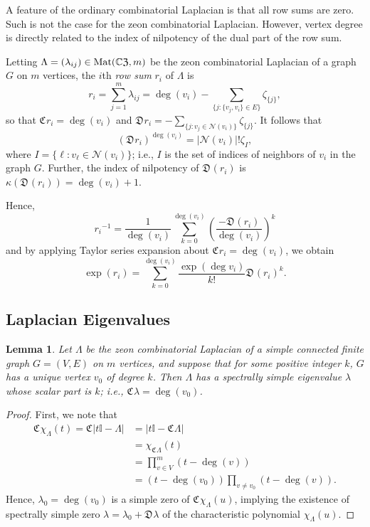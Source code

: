 \documentclass{article}
\newtheorem{lemma}[theorem]{Lemma}
\theoremstyle{definition}
\newcommand{\zco}{\mathfrak{C}\mspace{1mu}}
\newcommand{\zdu}{\mathfrak{D}\mspace{1mu}}
\newcommand{\CZ}{\mathbb{C}\mathfrak{Z}}
\newcommand{\Mat}{{\rm Mat}}
\newcommand{\mI}{\mathbb{I}}
\numberwithin{equation}{section}
\begin{document}
A feature of the ordinary combinatorial Laplacian is that all row sums are zero.  Such is not the case for the zeon combinatorial Laplacian.  However, vertex degree is directly related to the index of nilpotency of the dual part of the row sum.

Letting $\Lambda=(\lambda_{ij})\in\Mat(\CZ,m)$ be the zeon combinatorial Laplacian of a graph $G$ on $m$ vertices, the $i$th {\em row sum} $r_i$ of $\Lambda$ is 
\begin{equation*}
r_i=\sum_{j=1}^m \lambda_{ij}= \deg(v_i)-\sum_{\{j: \{v_j,v_i\}\in E\}}\zeta_{\{j\}},
\end{equation*}
so that $\zco r_i=\deg(v_i)$ and $\zdu r_i=-\sum_{\{j: v_j\in\mathcal{N}(v_i)\}}\zeta_{\{j\}}$.  It follows that \begin{equation}\label{row sum dual part}
(\zdu r_i)^{\deg(v_i)}=|\mathcal{N}(v_i)|!\zeta_{I},
\end{equation}
where $I=\{\ell: v_\ell\in\mathcal{N}(v_i)\}$; i.e., $I$ is the set of indices of neighbors of $v_i$ in the graph $G$.  Further, the index of nilpotency of $\zdu(r_i)$ is $\kappa(\zdu(r_i))=\deg(v_i)+1$.   

Hence, 
\begin{equation}\label{row sum inverse}
{r_i}^{-1}=\frac{1}{\deg(v_i)}\sum_{k=0}^{\deg(v_i)}\left(\frac{-\zdu(r_i)}{\deg(v_i)}\right)^k
\end{equation}
and by applying Taylor series expansion about $\zco r_i=\deg(v_i)$, we obtain 
\begin{equation}\label{row sum exponential}
\exp(r_i)=\sum_{k=0}^{\deg(v_i)}\frac{\exp(\deg v_i)}{k!}\zdu(r_i)^k.
\end{equation}



\subsection{Laplacian Eigenvalues}

\begin{lemma}
Let $\Lambda$ be the zeon combinatorial Laplacian of a simple connected finite graph $G=(V,E)$ on $m$ vertices, and suppose that for some positive integer $k$, $G$ has a unique vertex $v_0$ of degree $k$.  Then $\Lambda$ has a  spectrally simple eigenvalue $\lambda$  whose scalar part is $k$; i.e., $\zco \lambda=\deg(v_0)$.
\end{lemma}

\begin{proof}
First, we note that
\begin{align*}
\zco\chi_{\Lambda}(t)=\zco \vert t\mI-\Lambda\vert&=\vert t\mI-\zco\Lambda\vert\\
&=\chi_{\zco \Lambda}(t)\\
&=\prod_{v\in V}^m (t-\deg(v))\\
&=(t-\deg(v_0))\prod_{v\ne v_0}(t-\deg(v)).
\end{align*}
Hence, $\lambda_0=\deg(v_0)$ is a simple zero of $\zco\chi_\Lambda(u)$, implying the existence of spectrally simple zero $\lambda=\lambda_0+\zdu \lambda$ of the characteristic polynomial $\chi_{\Lambda}(u)$.  
\end{proof}
  
\end{document}
